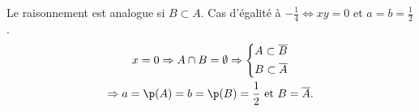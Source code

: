 Le raisonnement est analogue si $B\subset A$.\newline
Cas d'égalité à $-\frac{1}{4} \Leftrightarrow xy =0$ et $a = b = \frac{1}{2}$.
\begin{multline*}
  x = 0
  \Rightarrow A \cap B = \emptyset 
  \Rightarrow 
  \left\lbrace
  \begin{aligned}
    A \subset \overline{B} \\
    B \subset \overline{A}
  \end{aligned}
  \right. \\
  \Rightarrow a = \p(A)=  b = \p(B)=\frac{1}{2}  \text{ et } B = \overline{A}.
\end{multline*}

